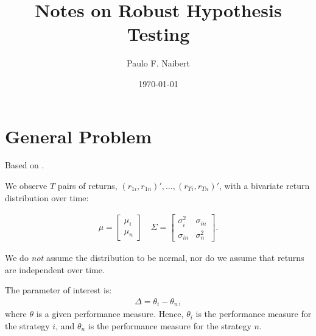 \documentclass[12pt,oneside,a4paper]{article}
\begin{document}
\title{Notes on Robust Hypothesis Testing}
\author{Paulo F. Naibert}
\date{\today}

\maketitle

\thispagestyle{headings}
\section{General Problem}
Based on \cite{lw2008, lw2011, lw2018}.

We observe $T$ pairs of returns, $(r_{1i}, r_{1n})', \dots, (r_{Ti}, r_{Tn})'$, with a bivariate return distribution over time:
% 

\begin{align*}
\mu=
\begin{bmatrix}
\mu_{i} \\ \mu_{n}
\end{bmatrix}
\quad
\Sigma=
\begin{bmatrix}
\sigma_{i}^2 & \sigma_{in}
\\
\sigma_{in} & \sigma_{n}^2
\end{bmatrix}.
\end{align*}

We do \textit{not} assume the distribution to be normal, nor do we assume that returns are independent over time.

The parameter of interest is:
\begin{align} \label{eq:delta}
	\Delta = \theta_{i} - \theta_{n},
\end{align}
where $\theta$ is a given performance measure.
Hence, $\theta_{i}$ is the performance measure for the strategy $i$, and $\theta_{n}$ is the performance measure for the strategy $n$.
\end{document}
